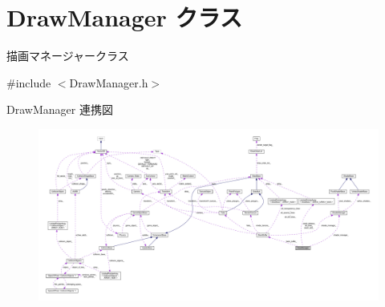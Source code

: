 \hypertarget{class_draw_manager}{}\section{Draw\+Manager クラス}
\label{class_draw_manager}


描画マネージャークラス  




{\ttfamily \#include $<$Draw\+Manager.\+h$>$}



Draw\+Manager 連携図\nopagebreak
\begin{figure}[H]
\begin{center}
\leavevmode
\includegraphics[width=350pt]{class_draw_manager__coll__graph}
\end{center}
\end{figure}
